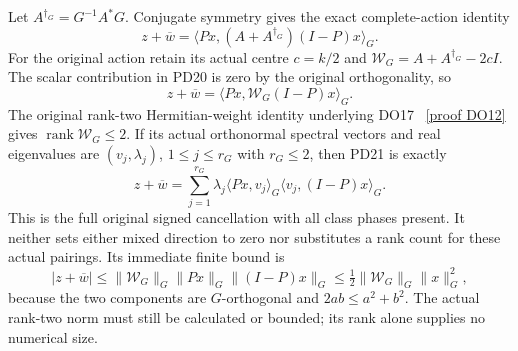\documentclass[11pt]{article}
\newcommand{\rank}{\operatorname{rank}}
\begin{document}
Let $A^{\dagger_G}=G^{-1}A^*G$.  Conjugate symmetry gives the exact
complete-action identity
\[
 \boxed{z+\overline w
       =\langle Px,(A+A^{\dagger_G})(I-P)x\rangle_G.}            \tag{PD20}
\]
For the original action retain its actual centre $c=k/2$ and
$\mathcal W_G=A+A^{\dagger_G}-2cI$.  The scalar contribution in
PD20 is zero by the original orthogonality, so
\[
 z+\overline w=\langle Px,\mathcal W_G(I-P)x\rangle_G.           \tag{PD21}
\]
The original rank-two Hermitian-weight identity underlying DO17 \cite{DO}%
~\href{https://github.com/KokunoYumeto/zeta-function-research-reader/blob/5992ad50c0f2a06921f1fcaded7b4e38097c0739/workbenches/splitzero-tandem/continuations/20260920-original-kernel-mixed-determinants/providers/CONSTANT_DEPTH_ORIGINAL_OBSERVATION.tex\#L145}{[proof DO12]}%
{}
gives $\rank\mathcal W_G\le2$.  If its actual orthonormal spectral
vectors and real eigenvalues are $(v_j,\lambda_j)$, $1\le j\le r_G$
with $r_G\le2$, then PD21 is exactly
\[
 z+\overline w
   =\sum_{j=1}^{r_G}\lambda_j
       \langle Px,v_j\rangle_G\langle v_j,(I-P)x\rangle_G.        \tag{PD22}
\]
This is the full original signed cancellation with all class phases
present.  It neither sets either mixed direction to zero nor
substitutes a rank count for these actual pairings.  Its immediate
finite bound is
\[
 |z+\overline w|
 \le\|\mathcal W_G\|_G\|Px\|_G\|(I-P)x\|_G
 \le\tfrac12\|\mathcal W_G\|_G\|x\|_G^2,                      \tag{PD23}
\]
because the two components are $G$-orthogonal and
$2ab\le a^2+b^2$.  The actual rank-two norm must still be
calculated or bounded; its rank alone supplies no numerical size.
\end{document}
